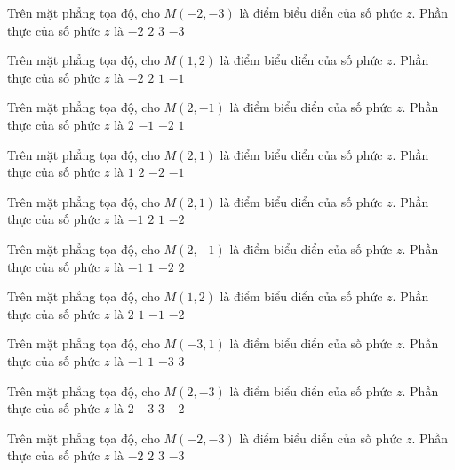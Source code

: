 
\begin{ex}
 Trên mặt phẳng tọa độ, cho $M(-2,-3)$ là điểm biểu diển của số phức $z$. Phần thực của số phức $z$ là
\choice
{\True $-2$}
{$2$}
{$3$}
{$-3$}
\end{ex}
\begin{ex}
 Trên mặt phẳng tọa độ, cho $M(1,2)$ là điểm biểu diển của số phức $z$. Phần thực của số phức $z$ là
\choice
{$-2$}
{$2$}
{\True $1$}
{$-1$}
\end{ex}
\begin{ex}
 Trên mặt phẳng tọa độ, cho $M(2,-1)$ là điểm biểu diển của số phức $z$. Phần thực của số phức $z$ là
\choice
{\True $2$}
{$-1$}
{$-2$}
{$1$}
\end{ex}
\begin{ex}
 Trên mặt phẳng tọa độ, cho $M(2,1)$ là điểm biểu diển của số phức $z$. Phần thực của số phức $z$ là
\choice
{$1$}
{\True $2$}
{$-2$}
{$-1$}
\end{ex}
\begin{ex}
 Trên mặt phẳng tọa độ, cho $M(2,1)$ là điểm biểu diển của số phức $z$. Phần thực của số phức $z$ là
\choice
{$-1$}
{\True $2$}
{$1$}
{$-2$}
\end{ex}
\begin{ex}
 Trên mặt phẳng tọa độ, cho $M(2,-1)$ là điểm biểu diển của số phức $z$. Phần thực của số phức $z$ là
\choice
{$-1$}
{$1$}
{$-2$}
{\True $2$}
\end{ex}
\begin{ex}
 Trên mặt phẳng tọa độ, cho $M(1,2)$ là điểm biểu diển của số phức $z$. Phần thực của số phức $z$ là
\choice
{$2$}
{\True $1$}
{$-1$}
{$-2$}
\end{ex}
\begin{ex}
 Trên mặt phẳng tọa độ, cho $M(-3,1)$ là điểm biểu diển của số phức $z$. Phần thực của số phức $z$ là
\choice
{$-1$}
{$1$}
{\True $-3$}
{$3$}
\end{ex}
\begin{ex}
 Trên mặt phẳng tọa độ, cho $M(2,-3)$ là điểm biểu diển của số phức $z$. Phần thực của số phức $z$ là
\choice
{\True $2$}
{$-3$}
{$3$}
{$-2$}
\end{ex}
\begin{ex}
 Trên mặt phẳng tọa độ, cho $M(-2,-3)$ là điểm biểu diển của số phức $z$. Phần thực của số phức $z$ là
\choice
{\True $-2$}
{$2$}
{$3$}
{$-3$}
\end{ex}
